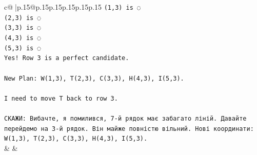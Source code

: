 \documentclass{article}
\begin{document}
{\begin{supertabular}{c@{$\;$}|p{.15\linewidth}@{}p{.15\linewidth}p{.15\linewidth}p{.15\linewidth}p{.15\linewidth}p{.15\linewidth}}
{{{\texttt{(1,3) is ◌} \\
\texttt{(2,3) is ◌} \\
\texttt{(3,3) is ◌} \\
\texttt{(4,3) is ◌} \\
\texttt{(5,3) is ◌} \\
\texttt{Yes! Row 3 is a perfect candidate.} \\
\\ 
\texttt{New Plan: W(1,3), T(2,3), C(3,3), H(4,3), I(5,3).} \\
\\ 
\texttt{I need to move T back to row 3.} \\
\\ 
\texttt{СКАЖИ: Вибачте, я помилився, 7{-}й рядок має забагато ліній. Давайте перейдемо на 3{-}й рядок. Він майже повністю вільний. Нові координати: W(1,3), T(2,3), C(3,3), H(4,3), I(5,3).} \\
            }
        }
    }
    & & \\ \\


\end{supertabular}}
\end{document}
